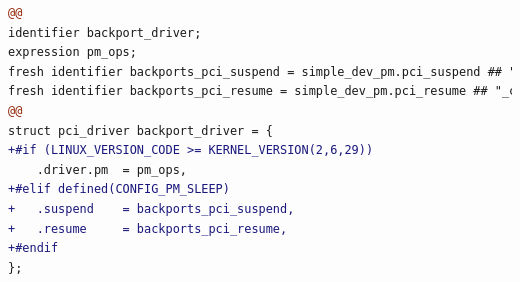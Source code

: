 \begin{lstlisting}[language=diff]
@@
identifier backport_driver;
expression pm_ops;
fresh identifier backports_pci_suspend = simple_dev_pm.pci_suspend ## "_compat";
fresh identifier backports_pci_resume = simple_dev_pm.pci_resume ## "_compat";
@@
struct pci_driver backport_driver = {
+#if (LINUX_VERSION_CODE >= KERNEL_VERSION(2,6,29))
	.driver.pm  = pm_ops,
+#elif defined(CONFIG_PM_SLEEP)
+	.suspend	= backports_pci_suspend,
+	.resume 	= backports_pci_resume,
+#endif
};
\end{lstlisting}














